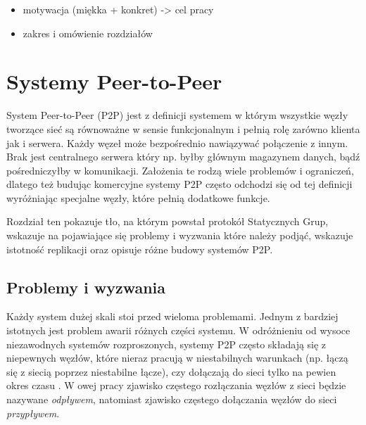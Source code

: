 \documentclass[12pt, twoside, openany]{report}
\begin{document}
\begin{itemize}
\item motywacja (miękka + konkret) -> cel pracy
\item zakres i omówienie rozdziałów
\end{itemize}


\chapter{Systemy Peer-to-Peer}

System Peer-to-Peer (P2P) \cite{bib:martins, bib:jeyasheeli, bib:chord} jest z definicji systemem w którym wszystkie węzły tworzące sieć są równoważne w sensie funkcjonalnym i pełnią rolę zarówno klienta jak i serwera. Każdy węzeł może bezpośrednio nawiązywać połączenie z innym. Brak jest centralnego serwera który np. byłby głównym magazynem danych, bądź pośredniczyłby w komunikacji. Założenia te rodzą wiele problemów i ograniczeń, dlatego też budując komercyjne systemy P2P często odchodzi się od tej definicji wyróżniając specjalne węzły, które pełnią dodatkowe funkcje.

Rozdział ten pokazuje tło, na którym powstał protokół Statycznych Grup, wskazuje na pojawiające się problemy i wyzwania które należy podjąć, wskazuje istotność replikacji oraz opisuje różne budowy systemów P2P.

\section{Problemy i wyzwania}

Każdy system dużej skali stoi przed wieloma problemami. Jednym z bardziej istotnych jest problem awarii różnych części systemu. W odróżnieniu od wysoce niezawodnych systemów rozproszonych, systemy P2P często składają się z niepewnych węzłów, które nieraz pracują w niestabilnych warunkach (np. łączą się z siecią poprzez niestabilne łącze), czy dołączają do sieci tylko na pewien okres czasu \cite{bib:paiva}. W owej pracy zjawisko częstego rozłączania węzłów z sieci będzie nazywane \textit{odpływem}, natomiast zjawisko częstego dołączania węzłów do sieci \textit{przypływem}.
\end{document}
